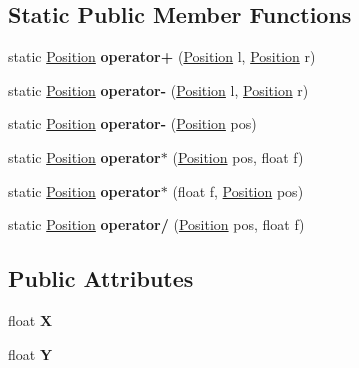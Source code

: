 \subsection*{Static Public Member Functions}
\begin{DoxyCompactItemize}
\item 
\mbox{\label{struct_n_g_a_p_i_1_1_position_a1ef846e149945376bf7791ff229c3de0}} 
static \hyperlink{struct_n_g_a_p_i_1_1_position}{Position} {\bfseries operator+} (\hyperlink{struct_n_g_a_p_i_1_1_position}{Position} l, \hyperlink{struct_n_g_a_p_i_1_1_position}{Position} r)
\item 
\mbox{\label{struct_n_g_a_p_i_1_1_position_ac95ff513e18b0b3ea516d207b522d513}} 
static \hyperlink{struct_n_g_a_p_i_1_1_position}{Position} {\bfseries operator-\/} (\hyperlink{struct_n_g_a_p_i_1_1_position}{Position} l, \hyperlink{struct_n_g_a_p_i_1_1_position}{Position} r)
\item 
\mbox{\label{struct_n_g_a_p_i_1_1_position_a8af9a80839096dcec31a11f9f8eaf86a}} 
static \hyperlink{struct_n_g_a_p_i_1_1_position}{Position} {\bfseries operator-\/} (\hyperlink{struct_n_g_a_p_i_1_1_position}{Position} pos)
\item 
\mbox{\label{struct_n_g_a_p_i_1_1_position_aab32a8a8ddcf36b89cb3daa0afcc2522}} 
static \hyperlink{struct_n_g_a_p_i_1_1_position}{Position} {\bfseries operator$\ast$} (\hyperlink{struct_n_g_a_p_i_1_1_position}{Position} pos, float f)
\item 
\mbox{\label{struct_n_g_a_p_i_1_1_position_a23a619177490bf8f1e6fbd04f9a2e292}} 
static \hyperlink{struct_n_g_a_p_i_1_1_position}{Position} {\bfseries operator$\ast$} (float f, \hyperlink{struct_n_g_a_p_i_1_1_position}{Position} pos)
\item 
\mbox{\label{struct_n_g_a_p_i_1_1_position_a44a68b247e7b163e68ca141fb1f5382c}} 
static \hyperlink{struct_n_g_a_p_i_1_1_position}{Position} {\bfseries operator/} (\hyperlink{struct_n_g_a_p_i_1_1_position}{Position} pos, float f)
\end{DoxyCompactItemize}
\subsection*{Public Attributes}
\begin{DoxyCompactItemize}
\item 
\mbox{\label{struct_n_g_a_p_i_1_1_position_ac88af035266ecc7d81a185a2d5e8ff77}} 
float {\bfseries X}
\item 
\mbox{\label{struct_n_g_a_p_i_1_1_position_a7b5272e82da25732cc6eff58fde41ca6}} 
float {\bfseries Y}
\end{DoxyCompactItemize}
